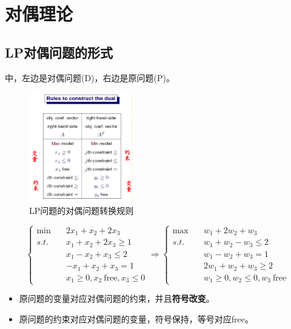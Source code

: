 \section{对偶理论}
\subsection{LP对偶问题的形式}
\begin{note}
    中，左边是对偶问题(D)，右边是原问题(P)。
    \begin{figure}[htbp]
        \centering
        \includegraphics[width=0.4\textwidth]{./figures/img2.png}
        \caption{LP问题的对偶问题转换规则 \label{fig2}}
    \end{figure}
    \[\begin{cases}
        \min \quad & 2x_1 + x_2 + 2x_3\\
        s.t. \quad & x_1 + x_2 + 2x_3 \ge 1\\
        &x_1 - x_2 + x_3 \le 2\\
        &-x_1 + x_2 + x_3 = 1\\
        &x_1 \ge 0, x_2 \ \text{free}, x_3 \le 0
    \end{cases} \Longrightarrow \begin{cases}
        \max \quad & w_1 + 2w_2 + w_3\\
        s.t. \quad & w_1 + w_2 - w_3 \le 2\\
        &w_1 - w_2 + w_3 = 1\\
        &2w_1 + w_2 + w_3 \ge 2\\
        &w_1 \ge 0, w_2 \le 0, w_3 \ \text{free}
    \end{cases}\]
    \begin{itemize}
        \item 原问题的变量对应对偶问题的约束，并且\textbf{符号改变}。
        \item 原问题的约束对应对偶问题的变量，符号保持，等号对应free。
    \end{itemize}
\end{note}

